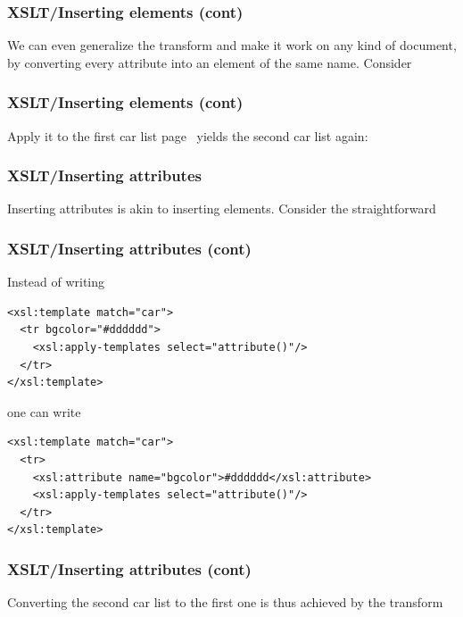 %
\begin{frame}
\frametitle{XSLT/Inserting elements (cont)}

We can even generalize the transform and make it work on any kind of
document, by converting every attribute into an element of the same
name. Consider

\end{frame}

%
\begin{frame}
\frametitle{XSLT/Inserting elements (cont)}

Apply it to the first car list page~\pageref{cars} yields the second
car list again: 

\end{frame}

%
\begin{frame}
\frametitle{XSLT/Inserting attributes}

Inserting attributes is akin to inserting elements. Consider the
straightforward

\end{frame}

%
\begin{frame}[containsverbatim]
\frametitle{XSLT/Inserting attributes (cont)}

Instead of writing
{\small
\begin{verbatim}
<xsl:template match="car">
  <tr bgcolor="#dddddd">
    <xsl:apply-templates select="attribute()"/>
  </tr>
</xsl:template>
\end{verbatim}
}
one can write
{\small
\begin{verbatim}
<xsl:template match="car">
  <tr>
    <xsl:attribute name="bgcolor">#dddddd</xsl:attribute>
    <xsl:apply-templates select="attribute()"/>
  </tr>
</xsl:template>
\end{verbatim}
}

\end{frame}

%
\begin{frame}
\frametitle{XSLT/Inserting attributes (cont)}

Converting the second car list to the first one is thus achieved by
the transform

\end{frame}

